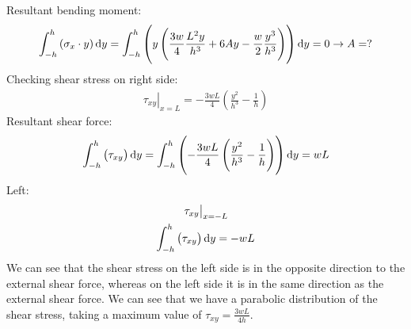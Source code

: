 \documentclass[11pt]{article}
\numberwithin{equation}{section}
\begin{document}
Resultant bending moment:
\begin{gather}
    \int_{-h}^h \left(\sigma_x \cdot y\right)\dif y = \int_{-h}^h \left(y\left(\frac{3w}{4}\frac{L^2y}{h^3} + 6Ay -\frac{w}{2}\frac{y^3}{h^3}\right)\right)\dif y = 0 \rightarrow A = ?
\end{gather}
Checking shear stress on right side:
\begin{gather}
    \left.\tau_{xy}\right|_{x=L} = -\frac{3wL}{4}\left(\frac{y^2}{h^3} - \frac{1}{h}\right)
\end{gather}
Resultant shear force:
\begin{gather}
    \int_{-h}^h \left(\tau_{xy}\right)\dif y = \int_{-h}^h \left(-\frac{3wL}{4}\left(\frac{y^2}{h^3}-\frac{1}{h}\right)\right)\dif y = wL
\end{gather}
Left:
\begin{gather}
    \left. \tau_{xy} \right|_{x = -L}\\
    \int_{-h}^h \left(\tau_{xy}\right)\dif y = - wL
\end{gather}
We can see that the shear stress on the left side is in the opposite direction to the external shear force, whereas on the left side it is in the same direction as the external shear force. We can see that we have a parabolic distribution of the shear stress, taking a maximum value of $\tau_{xy} = \frac{3wL}{4h}$.
\end{document}
